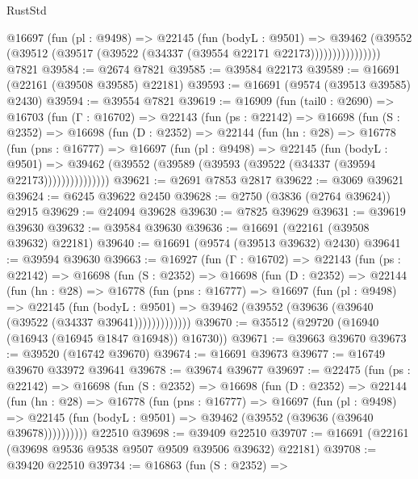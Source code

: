 \begin{lexlean}{RustStd}
\begin{coremodule}
                  @16697
                    (fun (pl : @9498) =>
                    @22145
                      (fun (bodyL : @9501) =>
                      @39462
                        (@39552
                          (@39512 (@39517 (@39522 (@34337 (@39554 @22171 @22173))))))))))))))))
    @7821
@39584 := @2674 @7821
@39585 := @39584 @22173
@39589 := @16691 (@22161 (@39508 @39585) @22181)
@39593 := @16691 (@9574 (@39513 @39585) @2430)
@39594 := @39554 @7821
@39619 := @16909
    (fun (tail0 : @2690) =>
    @16703
      (fun (Γ : @16702) =>
      @22143
        (fun (ps : @22142) =>
        @16698
          (fun (S : @2352) =>
          @16698
            (fun (D : @2352) =>
            @22144
              (fun (hn : @28) =>
              @16778
                (fun (pns : @16777) =>
                @16697
                  (fun (pl : @9498) =>
                  @22145
                    (fun (bodyL : @9501) =>
                    @39462 (@39552 (@39589 (@39593 (@39522 (@34337 (@39594 @22173)))))))))))))))
@39621 := @2691 @7853 @2817
@39622 := @3069 @39621
@39624 := @6245 @39622 @2450
@39628 := @2750 (@3836 (@2764 @39624)) @2915
@39629 := @24094 @39628
@39630 := @7825 @39629
@39631 := @39619 @39630
@39632 := @39584 @39630
@39636 := @16691 (@22161 (@39508 @39632) @22181)
@39640 := @16691 (@9574 (@39513 @39632) @2430)
@39641 := @39594 @39630
@39663 := @16927
    (fun (Γ : @16702) =>
    @22143
      (fun (ps : @22142) =>
      @16698
        (fun (S : @2352) =>
        @16698
          (fun (D : @2352) =>
          @22144
            (fun (hn : @28) =>
            @16778
              (fun (pns : @16777) =>
              @16697
                (fun (pl : @9498) =>
                @22145
                  (fun (bodyL : @9501) =>
                  @39462 (@39552 (@39636 (@39640 (@39522 (@34337 @39641)))))))))))))
@39670 := @35512 (@29720 (@16940 (@16943 (@16945 @1847 @16948)) @16730))
@39671 := @39663 @39670
@39673 := @39520 (@16742 @39670)
@39674 := @16691 @39673
@39677 := @16749 @39670 @33972 @39641
@39678 := @39674 @39677
@39697 := @22475
    (fun (ps : @22142) =>
    @16698
      (fun (S : @2352) =>
      @16698
        (fun (D : @2352) =>
        @22144
          (fun (hn : @28) =>
          @16778
            (fun (pns : @16777) =>
            @16697
              (fun (pl : @9498) =>
              @22145 (fun (bodyL : @9501) => @39462 (@39552 (@39636 (@39640 @39678))))))))))
    @22510
@39698 := @39409 @22510
@39707 := @16691 (@22161 (@39698 @9536 @9538 @9507 @9509 @39506 @39632) @22181)
@39708 := @39420 @22510
@39734 := @16863
    (fun (S : @2352) =>

\end{coremodule}
\end{lexlean}
